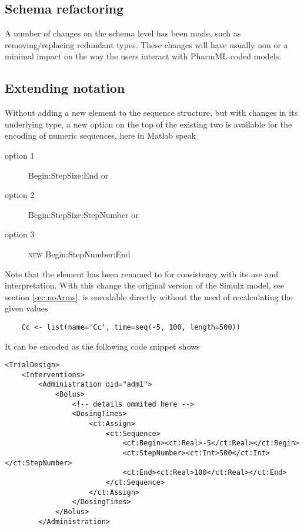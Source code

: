 \subsection{Schema refactoring}
A number of changes on the schema level has been made, such as 
removing/replacing redundant types. These changes will have usually non or a minimal 
impact on the way the users interact with PharmML coded models. 

\subsection{Extending  notation}
Without adding a new element to the sequence structure, but with changes in its
underlying type, a new option on the top of the existing two is available for the encoding of 
numeric sequences, here in Matlab speak
\begin{description}
\item[option 1]
Begin:StepSize:End or
\item[option 2] 
Begin:StepSize:StepNumber or
\item[option 3]
{\color{red} \scshape{new}} Begin:StepNumber:End
\end{description}
Note that the  element has been renamed to 
for consistency with its use and interpretation.
With this change the original version of the Simulx model, see section \ref{sec:noArms}, 
is encodable directly without the need of recalculating the given values
\lstset{language=MLX}
\begin{lstlisting}
	Cc <- list(name='Cc', time=seq(-5, 100, length=500))
\end{lstlisting}
It can be encoded as the following code snippet shows
\lstset{language=XML}
\begin{lstlisting}
<TrialDesign>
    <Interventions>
        <Administration oid="adm1">
            <Bolus>
                <!-- details ommited here -->
                <DosingTimes>
                    <ct:Assign>
                        <ct:Sequence>
                            <ct:Begin><ct:Real>-5</ct:Real></ct:Begin>
                            <ct:StepNumber><ct:Int>500</ct:Int></ct:StepNumber>
                            <ct:End><ct:Real>100</ct:Real></ct:End>
                        </ct:Sequence>
                    </ct:Assign>
                </DosingTimes>
            </Bolus>
        </Administration>
\end{lstlisting}














